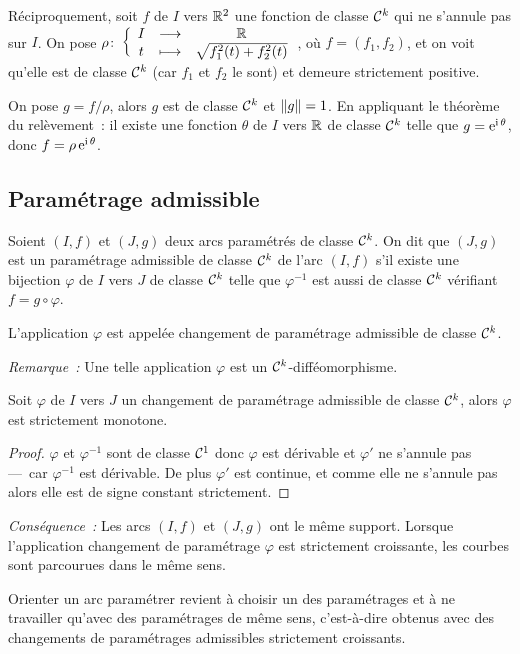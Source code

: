 Réciproquement, soit $f$ de $I$ vers $\mathbb{R}^2$ une fonction de classe $\mathcal{C}^{k}$ qui  ne s'annule pas sur $I$. On pose $\rho\colon \left\{\begin{array}{ccc} I & \longrightarrow &\mathbb{R}\\ t & \longmapsto & \sqrt{f_1^2(t)+f_2^2(t)} \end{array} \right.$, où $f=(f_1, f_2)$, et on voit qu'elle est de classe $\mathcal{C}^{k}$ (car $f_1$ et $f_2$ le sont) et demeure strictement positive. 

On pose $g=f/\rho$, alors $g$ est de classe $\mathcal{C}^{k}$ et $\left\lVert g\right\rVert=1$. En appliquant le théorème du relèvement~: il existe une fonction $\theta$ de $I$ vers $\mathbb{R}$ de classe $\mathcal{C}^{k}$ telle que $g=\operatorname{e}^{\operatorname{i} \theta}$, donc $f=\rho \operatorname{e}^{\operatorname{i} \theta}$.

\subsection{Paramétrage admissible}

\begin{defdef}
  Soient $(I, f)$ et $(J, g)$ deux arcs paramétrés de classe $\mathcal{C}^{k}$. On dit que $(J, g)$ est un paramétrage admissible de classe $\mathcal{C}^{k}$ de l'arc $(I, f)$ s'il existe une bijection $\varphi$ de $I$ vers $J$ de classe $\mathcal{C}^{k}$ telle que $\varphi^{-1}$ est aussi de classe $\mathcal{C}^{k}$ vérifiant $f=g \circ \varphi$.

L'application $\varphi$ est appelée changement de paramétrage admissible de classe $\mathcal{C}^{k}$.
\end{defdef}

\emph{Remarque~:} Une telle application $\varphi$ est un $\mathcal{C}^{k}$-difféomorphisme.

\begin{prop}
  Soit $\varphi$ de $I$ vers $J$ un changement de paramétrage admissible de classe $\mathcal{C}^{k}$, alors $\varphi$ est strictement monotone.
\end{prop}
\begin{proof}
$\varphi$ et $\varphi^{-1}$ sont de classe $\mathcal{C}^{1}$ donc $\varphi$ est dérivable et $\varphi'$ ne s'annule pas ---~car $\varphi^{-1}$ est dérivable. De plus $\varphi'$ est continue, et comme elle ne s'annule pas alors elle est de signe constant strictement.
\end{proof}

\emph{Conséquence~:} Les arcs $(I, f)$ et $(J, g)$ ont le même support. Lorsque l'application changement de paramétrage $\varphi$ est strictement croissante, les courbes sont parcourues dans le même sens.

\begin{defdef}
  Orienter un arc paramétrer revient à choisir un des paramétrages et à ne travailler qu'avec des paramétrages de même sens, c'est-à-dire obtenus avec des changements de paramétrages admissibles strictement croissants.
\end{defdef}

